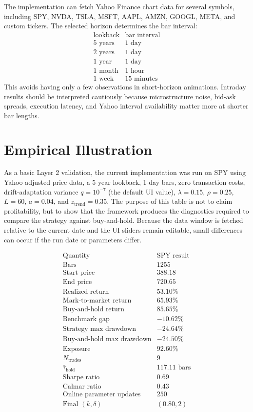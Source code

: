 \documentclass[11pt]{article}
\begin{document}
The implementation can fetch Yahoo Finance chart data for several symbols, including SPY, NVDA, TSLA, MSFT, AAPL, AMZN, GOOGL, META, and custom tickers. The selected horizon determines the bar interval:
\[
\begin{array}{c|c}
\text{lookback} & \text{bar interval}\\
\hline
5\text{ years} & 1\text{ day}\\
2\text{ years} & 1\text{ day}\\
1\text{ year} & 1\text{ day}\\
1\text{ month} & 1\text{ hour}\\
1\text{ week} & 15\text{ minutes}
\end{array}
\]
This avoids having only a few observations in short-horizon animations. Intraday results should be interpreted cautiously because microstructure noise, bid-ask spreads, execution latency, and Yahoo interval availability matter more at shorter bar lengths.

\section{Empirical Illustration}

As a basic Layer 2 validation, the current implementation was run on SPY using Yahoo adjusted price data, a 5-year lookback, 1-day bars, zero transaction costs, drift-adaptation variance \(q=10^{-7}\) (the default UI value), \(\lambda=0.15\), \(\rho=0.25\), \(L=60\), \(a=0.04\), and \(z_{\mathrm{trend}}=0.35\). The purpose of this table is not to claim profitability, but to show that the framework produces the diagnostics required to compare the strategy against buy-and-hold. Because the data window is fetched relative to the current date and the UI sliders remain editable, small differences can occur if the run date or parameters differ.

\[
\begin{array}{l|r}
\text{Quantity} & \text{SPY result}\\
\hline
\text{Bars} & 1255\\
\text{Start price} & 388.18\\
\text{End price} & 720.65\\
\text{Realized return} & 53.10\%\\
\text{Mark-to-market return} & 65.93\%\\
\text{Buy-and-hold return} & 85.65\%\\
\text{Benchmark gap} & -10.62\%\\
\text{Strategy max drawdown} & -24.64\%\\
\text{Buy-and-hold max drawdown} & -24.50\%\\
\text{Exposure} & 92.60\%\\
N_{\mathrm{trades}} & 9\\
\bar\tau_{\mathrm{hold}} & 117.11\text{ bars}\\
\text{Sharpe ratio} & 0.69\\
\text{Calmar ratio} & 0.43\\
\text{Online parameter updates} & 250\\
\text{Final }(k,\delta) & (0.80,2)
\end{array}
\]
\end{document}
